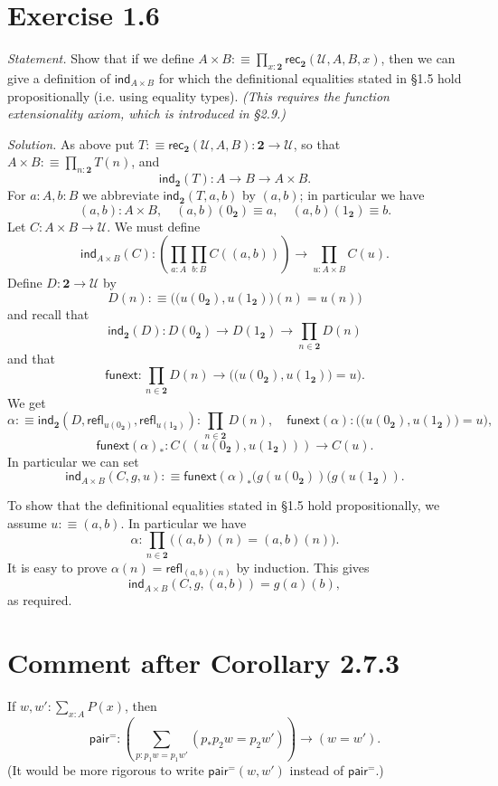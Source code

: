\documentclass[12pt]{article}
\newcommand{\msf}{\mathsf}
\newcommand{\two}{\mathbf2}
\newcommand{\nn}{\noindent}
\newcommand{\fu}{\mathsf{funext}}
\newcommand{\ind}{\mathsf{ind}}
\newcommand{\rec}{\mathsf{rec}}
\newcommand{\refl}{\mathsf{refl}}
\newcommand{\U}{\mathcal U}
\begin{document}

\section{Exercise 1.6}

\emph{Statement.} Show that if we define $A\times B:\equiv\prod_{x:\two}\rec_\two(\U,A,B,x)$, then we can give a definition of  $\ind_{A\times B}$ for which the definitional equalities stated in \S1.5 hold propositionally (i.e. using equality types). \emph{(This requires the function extensionality axiom, which is introduced in \S2.9.)}

\nn\emph{Solution.} As above put $T:\equiv\rec_\two(\U,A,B):\two\to\U$, so that $A\times B:\equiv\prod_{n:\two}T(n)$, and 
$$
\ind_\two(T):A\to B\to A\times B.
$$ 
For $a:A,b:B$ we abbreviate $\ind_\two(T,a,b)$ by $(a,b)$; in particular we have 
$$
(a,b):A\times B,\quad(a,b)(0_\two)\equiv a,\quad(a,b)(1_\two)\equiv b.
$$ 
Let $C:A\times B\to\U$. We must define 
$$
\ind_{A\times B}(C):\left(\prod_{a:A}\prod_{b:B}C((a,b))\right)\to\prod_{u:A\times B}C(u).
$$ 
Define $D:\two\to\U$ by 
$$
D(n):\equiv\Big(\big(u(0_\two),u(1_\two)\big)(n)=u(n)\Big)
$$ 
and recall that 
$$
\ind_\two(D):D(0_\two)\to D(1_\two)\to\prod_{n\in\two}D(n)
$$ 
and that 
$$
\fu:\prod_{n\in\two}D(n)\to\Big(\big(u(0_\two),u(1_\two)\big)=u\Big).
$$
We get 
$$
\alpha:\equiv\ind_\two(D,\refl_{u(0_\two)},\refl_{u(1_\two)}):\prod_{n\in\two}D(n),\quad\fu(\alpha):\Big(\big(u(0_\two),u(1_\two)\big)=u\Big),
$$
$$
\fu(\alpha)_*:C((u(0_\two),u(1_\two)))\to C(u).
$$
In particular we can set
$$
\ind_{A\times B}(C,g,u):\equiv\fu(\alpha)_*(g(u(0_\two))(g(u(1_\two)).
$$

To show that the definitional equalities stated in \S1.5 hold propositionally, we assume $u:\equiv(a,b)$. In particular we have 
$$
\alpha:\prod_{n\in\two}\Big((a,b)(n)=(a,b)(n)\Big).
$$ 
It is easy to prove $\alpha(n)=\refl_{(a,b)(n)}$ by induction. This gives 
$$
\ind_{A\times B}(C,g,(a,b))=g(a)(b),
$$ 
as required.


\section{Comment after Corollary 2.7.3}

If $w,w':\sum_{x:A}P(x)$, then 
$$
\msf{pair}^=:\left(\sum_{p:p_1w=p_1w'}(p_*p_2w=p_2w')\right)\to(w=w').
$$ 
(It would be more rigorous to write $\msf{pair}^=(w,w')$ instead of $\msf{pair}^=$.)
\end{document}

